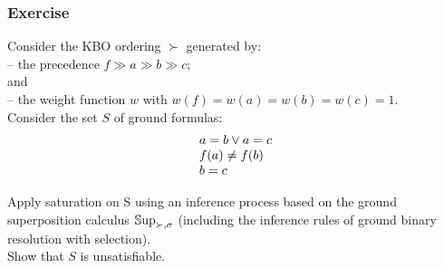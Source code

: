 \begin{frame}
  \frametitle{Exercise}

  Consider the KBO ordering $\succ$ generated by:\\[.5em]

  -- the precedence $ f\gg a \gg b \gg c$;\\[.5em]

and\\[.5em]

-- the weight function $w$ with $w(f)=w(a)=w(b)=w(c)=1$.\\[1em]


Consider the set $S$ of ground formulas:
\begin{equation*}
  \begin{array}{l}
    a=b \vee a=c\\
    f(a)\neq f(b)\\
    b=c
    \end{array}
    \end{equation*}

   Apply saturation on S using an inference process based on the
   ground superposition calculus $\SUPiss$ (including the inference
   rules of ground binary resolution with selection).\\[.5em]

   Show that $S$ is unsatisfiable.
   \\[1em]
   
\end{frame}




\endinput
\begin{frame}
\frametitle{Exercise}
Consider the KBO ordering $\succ$ generated by:\\[.5em]

-- the precedence $ P\gg Q\gg f\gg a$;\\[.5em]

and\\[.5em]

-- the weight function $w$ with $w(P)=w(Q)=2$, $w(f)=w(a)=1$.\\[1em]


Consider the set of clauses $S$ to be: 
\[\begin{array}{l}
{Q(a)},\\
 {\neg Q(a)}\vee f(a)=a, \\ 
 {\neg P(a)},\\ {P(f(a))}\}.
\end{array}\] 

Apply saturation on $S$ by using an inferece process with redundancy
based on the (ground) superposition calculus $\SUPiss$. 
\end{frame}





